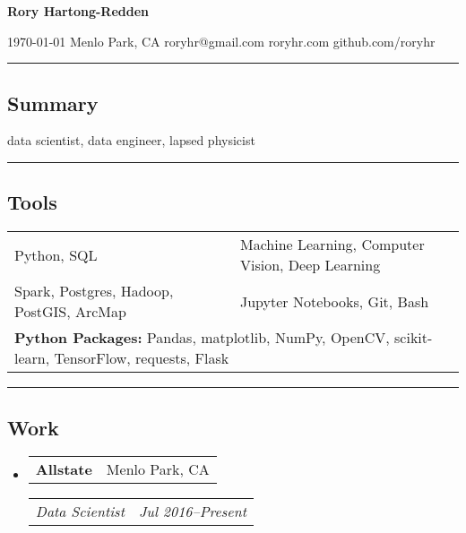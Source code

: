 \documentclass[10pt,letterpaper]{article}
\makeatletter
\newenvironment{indentsection}[1]
{\begin{list}{}%
	{\setlength{\leftmargin}{#1}}
	\item[]%
}
{\end{list}}
\newcommand{\headerrow}[2]{
\begin{tabular*}{\linewidth}{l@{\extracolsep{\fill}}r}
		#1 &
		#2 \\
	\end{tabular*}
}
\newcommand{\jobitem}[4]{\item \headerrow{\textbf{#1}}{#2}
\headerrow{\emph{#3}}{\emph{#4}}}
\makeatother
\begin{document}
{\raggedright \LARGE \bf Rory Hartong-Redden\\}

{\raggedleft 
\today \/ \textbar
\/ Menlo Park, CA \textbar
\/ roryhr@gmail.com \textbar
\/ roryhr.com \textbar\/   
github.com/roryhr\\
}
\hrule

\subsection*{Summary}
\begin{centering}  
data scientist, data engineer, lapsed physicist\\
\end{centering}

\hrule
\subsection*{Tools}
\begin{indentsection}{\parindent}
\begin{tabular}{p{0.5\linewidth}   p{0.5\linewidth}} 
	Python, SQL
	& Machine Learning, Computer Vision, Deep Learning \\

	Spark, Postgres, Hadoop, PostGIS, ArcMap 
	& Jupyter Notebooks, Git, Bash \\ 
	
	\multicolumn{2}{l}{
		\textbf{Python Packages:} Pandas, matplotlib, NumPy, OpenCV, scikit-learn,
							TensorFlow, requests, Flask} \\
\end{tabular}
\end{indentsection}

\hrule
\subsection*{Work}
\begin{itemize}
	\jobitem{Allstate}{Menlo Park, CA}
		     {Data Scientist}{Jul 2016--Present}
\end{itemize}
\end{document}

